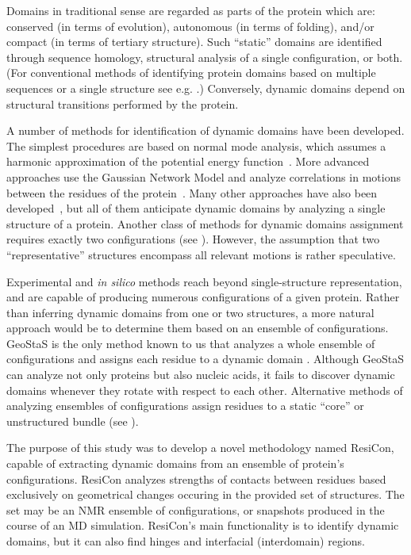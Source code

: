 \documentclass[a4paper,11pt,twoside]{book}%
\begin{document}
Domains in traditional sense are regarded as parts of the protein which are: conserved (in terms of evolution), autonomous (in terms of folding), and/or compact (in terms of tertiary structure).
Such ``static'' domains are identified through sequence homology, structural analysis of a single configuration, or both.
(For conventional methods of identifying protein domains based on multiple sequences or a single structure see e.g. \cite{richardson1981anatomy,bork1991shuffled}.)
Conversely, dynamic domains depend on structural transitions performed by the protein.

A number of methods for identification of dynamic domains have been developed.
The simplest procedures are based on normal mode analysis, which assumes a harmonic approximation of the potential energy function~\cite{hinsen1998analysis}.
More advanced approaches use the Gaussian Network Model and analyze correlations in motions between the residues of the protein~\cite{yesylevskyy2006dynamic}.
Many other approaches have also been developed~\cite{bahar1997direct,wriggers1997protein,bernhard2010optimal,genoni2012identification,potestio2009coarse}, but all of them anticipate dynamic domains by analyzing a single structure of a protein.
Another class of methods for dynamic domains assignment requires exactly two configurations (see \cite{hayward1998systematic,lee2003dyndom,ye2003flexible}).
However, the assumption that two ``representative'' structures encompass all relevant motions is rather speculative.

Experimental and \emph{in silico} methods reach beyond single-structure representation, and are capable of producing numerous configurations of a given protein.
Rather than inferring dynamic domains from one or two structures, a more natural approach would be to determine them based on an ensemble of configurations.
GeoStaS is the only method known to us that analyzes a whole ensemble of configurations and assigns each residue to a dynamic domain \cite{romanowska2012determining}.
Although GeoStaS can analyze not only proteins but also nucleic acids, it fails to discover dynamic domains whenever they rotate with respect to each other.
Alternative methods of analyzing ensembles of configurations assign residues to a static ``core'' or unstructured bundle (see \cite{snyder2005clustering,kirchner2011objective}).

The purpose of this study was to develop a novel methodology named ResiCon, capable of extracting dynamic domains from an ensemble of protein's configurations.
ResiCon analyzes strengths of contacts between residues based exclusively on geometrical changes occuring in the provided set of structures.
The set may be an NMR ensemble of configurations, or snapshots produced in the course of an MD simulation.
ResiCon's main functionality is to identify dynamic domains, but it can also find hinges and interfacial (interdomain) regions.
\end{document}
